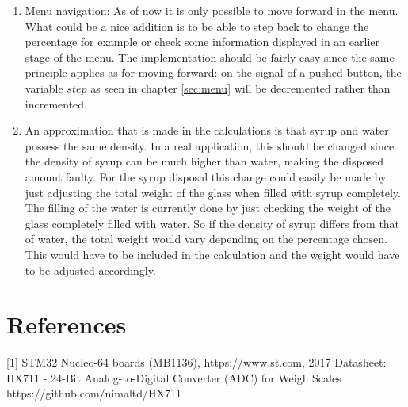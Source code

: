 \documentclass[twocolumn]{article}
\begin{document}
	\begin{enumerate}
		\item Menu navigation: As of now it is only possible to move forward in the menu. What could be a nice addition is to be able to step back to change the percentage for example or check some information displayed in an earlier stage of the menu. The implementation should be fairly easy since the same principle applies as for moving forward: on the signal of a pushed button, the variable $step$ as seen in chapter \ref{sec:menu} will be decremented rather than incremented.
		
		\item An approximation that is made in the calculations is that syrup and water possess the same density. In a real application, this should be changed since the density of syrup can be much higher than water, making the disposed amount faulty. For the syrup disposal this change could easily be made by just adjusting the total weight of the glass when filled with syrup completely. The filling of the water is currently done by just checking the weight of the glass completely filled with water. So if the density of syrup differs from that of water, the total weight would vary depending on the percentage chosen. This would have to be included in the calculation and the weight would have to be adjusted accordingly.
	\end{enumerate} 

	
	\section*{References}
	[1] STM32 Nucleo-64 boards (MB1136), https://www.st.com, 2017 \newline 
	[2] Datasheet: HX711 - 24-Bit Analog-to-Digital Converter (ADC) for Weigh Scales
	\newline
	[3] https://github.com/nimaltd/HX711
\end{document}
